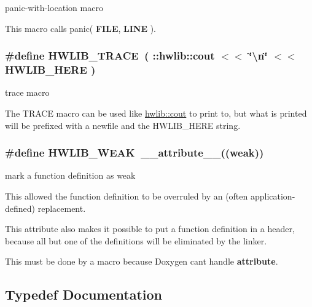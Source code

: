 panic-\/with-\/location macro 

This macro calls panic( {\bfseries F\+I\+LE}, {\bfseries L\+I\+NE} ). 
\subsubsection[{\texorpdfstring{H\+W\+L\+I\+B\+\_\+\+T\+R\+A\+CE}{HWLIB_TRACE}}]{\setlength{\rightskip}{0pt plus 5cm}\#define H\+W\+L\+I\+B\+\_\+\+T\+R\+A\+CE~( \+::{\bf hwlib\+::cout} $<$$<$ \char`\"{}\textbackslash{}n\char`\"{} $<$$<$ H\+W\+L\+I\+B\+\_\+\+H\+E\+RE )}\hypertarget{hwlib-defines_8hpp_a536d8e892418f0e4127db75a6f653add}{}\label{hwlib-defines_8hpp_a536d8e892418f0e4127db75a6f653add}


trace macro 

The T\+R\+A\+CE macro can be used like \hyperlink{namespacehwlib_ac985c212834e4eb219aedede6efff2dc}{hwlib\+::cout} to print to, but what is printed will be prefixed with a newfile and the H\+W\+L\+I\+B\+\_\+\+H\+E\+RE string. 
\subsubsection[{\texorpdfstring{H\+W\+L\+I\+B\+\_\+\+W\+E\+AK}{HWLIB_WEAK}}]{\setlength{\rightskip}{0pt plus 5cm}\#define H\+W\+L\+I\+B\+\_\+\+W\+E\+AK~\+\_\+\+\_\+attribute\+\_\+\+\_\+((weak))}\hypertarget{hwlib-defines_8hpp_a04be4340016df60d6636c1d1c6d94fc9}{}\label{hwlib-defines_8hpp_a04be4340016df60d6636c1d1c6d94fc9}


mark a function definition as weak 

This allowed the function definition to be overruled by an (often application-\/defined) replacement.

This attribute also makes it possible to put a function definition in a header, because all but one of the definitions will be eliminated by the linker.

This must be done by a macro because Doxygen can\textquotesingle{}t handle {\bfseries attribute}. 

\subsection{Typedef Documentation}

